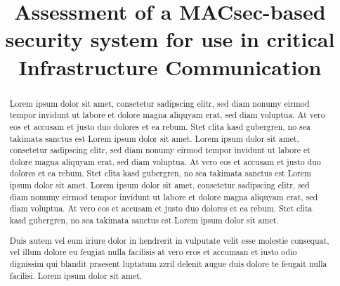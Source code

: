\documentclass[conference, onecolumn, a4paper]{IEEEtran}
\begin{document}
\title{Assessment of a MACsec-based security system for use in critical Infrastructure Communication}

\author{
    \vspace{6 pt}
}

\maketitle

\begin{abstract}
    Lorem ipsum dolor sit amet, consetetur sadipscing elitr, sed diam nonumy eirmod tempor invidunt ut labore et dolore magna aliquyam erat, sed diam 
    voluptua. At vero eos et accusam et justo duo dolores et ea rebum. Stet clita kasd gubergren, no sea takimata sanctus est Lorem ipsum dolor sit 
    amet. Lorem ipsum dolor sit amet, consetetur sadipscing elitr, sed diam nonumy eirmod tempor invidunt ut labore et dolore magna aliquyam erat, sed 
    diam voluptua. At vero eos et accusam et justo duo dolores et ea rebum. Stet clita kasd gubergren, no sea takimata sanctus est Lorem ipsum dolor 
    sit amet. Lorem ipsum dolor sit amet, consetetur sadipscing elitr, sed diam nonumy eirmod tempor invidunt ut labore et dolore magna aliquyam erat, 
    sed diam voluptua. At vero eos et accusam et justo duo dolores et ea rebum. Stet clita kasd gubergren, no sea takimata sanctus est Lorem ipsum dolor 
    sit amet.   

    Duis autem vel eum iriure dolor in hendrerit in vulputate velit esse molestie consequat, vel illum dolore eu feugiat nulla facilisis at vero eros et 
    accumsan et iusto odio dignissim qui blandit praesent luptatum zzril delenit augue duis dolore te feugait nulla facilisi. Lorem ipsum dolor sit amet,
\end{abstract}
\end{document}
